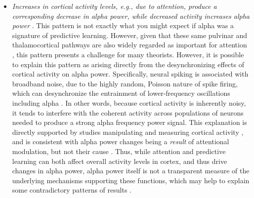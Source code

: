 \documentclass[11pt,twoside]{article}
\newif\myifpdf
\begin{document}
\begin{itemize}
	\item \emph{Increases in cortical activity levels, e.g., due to attention, produce a corresponding decrease in alpha power, while decreased activity increases alpha power}  \citep{WordenFoxeWangEtAl00,KellyLalorReillyEtAl06,KlimeschSausengHanslmayr07,FriesWomelsdorfOostenveldEtAl08,JensenMazaheri10,FosterAwh19}. This pattern is not exactly what you might expect if alpha was a signature of predictive learning.  However, given that these same pulvinar and thalamocortical pathways are also widely regarded as important for attention \citep{LaBergeBuchsbaum90,BenderYouakim01,SnowAllenRafalEtAl09,SaalmannKastner11,ZhouSchaferDesimone16,FiebelkornKastner19}, this pattern presents a challenge for many theorists.  However, it is possible to explain this pattern as arising directly from the desynchronizing effects of cortical activity on alpha power.  Specifically, neural spiking is associated with broadband noise, due to the highly random, Poisson nature of spike firing, which can desynchronize the entrainment of lower-frequency oscillations including alpha \citep{WaldertLemonKraskov13,RayMaunsell11,PrivmanMalachYeshurun13,SolomonKragelSperlingEtAl17}.  In other words, because cortical activity is inherently noisy, it tends to interfere with the coherent activity across populations of neurons needed to produce a strong alpha frequency power signal.  This explanation is directly supported by studies manipulating and measuring cortical activity \citep{ZhouSchaferDesimone16,FriesWomelsdorfOostenveldEtAl08}, and is consistent with alpha power changes being a \emph{result} of attentional modulation, but not their cause \citep{AntonovChakravarthiAndersen20}.  Thus, while attention and predictive learning can both affect overall activity levels in cortex, and thus drive changes in alpha power, alpha power itself is not a transparent measure of the underlying mechanisms supporting these functions, which may help to explain some contradictory patterns of results \citep{FosterAwh19,GundlachMorattiForschackEtAl20,KeitelKeitelBenwellEtAl19}.


\end{itemize}
\end{document}
